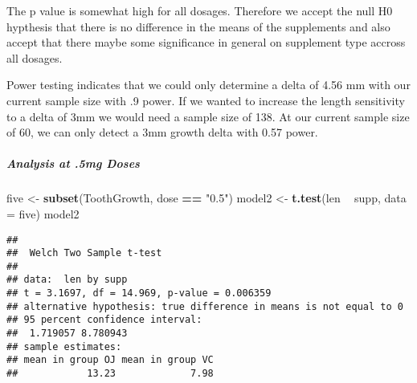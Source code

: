 \documentclass[]{article}
\newenvironment{Shaded}{\begin{snugshade}}{\end{snugshade}}
\newcommand{\DataTypeTok}[1]{\textcolor[rgb]{0.13,0.29,0.53}{#1}}
\newcommand{\DecValTok}[1]{\textcolor[rgb]{0.00,0.00,0.81}{#1}}
\newcommand{\FloatTok}[1]{\textcolor[rgb]{0.00,0.00,0.81}{#1}}
\newcommand{\KeywordTok}[1]{\textcolor[rgb]{0.13,0.29,0.53}{\textbf{#1}}}
\newcommand{\NormalTok}[1]{#1}
\newcommand{\OperatorTok}[1]{\textcolor[rgb]{0.81,0.36,0.00}{\textbf{#1}}}
\newcommand{\StringTok}[1]{\textcolor[rgb]{0.31,0.60,0.02}{#1}}
\let\oldsubparagraph\subparagraph
\renewcommand{\subparagraph}[1]{\oldsubparagraph{#1}\mbox{}}
\begin{document}
The p value is somewhat high for all dosages. Therefore we accept the
null H0 hypthesis that there is no difference in the means of the
supplements and also accept that there maybe some significance in
general on supplement type accross all dosages.

Power testing indicates that we could only determine a delta of 4.56 mm
with our current sample size with .9 power. If we wanted to increase the
length sensitivity to a delta of 3mm we would need a sample size of 138.
At our current sample size of 60, we can only detect a 3mm growth delta
with 0.57 power.

\hypertarget{analysis-at-.5mg-doses}{%
\subparagraph{Analysis at .5mg Doses}\label{analysis-at-.5mg-doses}}

\begin{Shaded}
\begin{Highlighting}[]
\NormalTok{five <-}\StringTok{ }\KeywordTok{subset}\NormalTok{(ToothGrowth, dose }\OperatorTok{==}\StringTok{ "0.5"}\NormalTok{)}
\NormalTok{model2 <-}\StringTok{ }\KeywordTok{t.test}\NormalTok{(len }\OperatorTok{~}\StringTok{ }\NormalTok{supp, }\DataTypeTok{data =}\NormalTok{ five)}
\NormalTok{model2}
\end{Highlighting}
\end{Shaded}

\begin{verbatim}
## 
##  Welch Two Sample t-test
## 
## data:  len by supp
## t = 3.1697, df = 14.969, p-value = 0.006359
## alternative hypothesis: true difference in means is not equal to 0
## 95 percent confidence interval:
##  1.719057 8.780943
## sample estimates:
## mean in group OJ mean in group VC 
##            13.23             7.98
\end{verbatim}

\begin{Shaded}
\end{Shaded}
\end{document}

